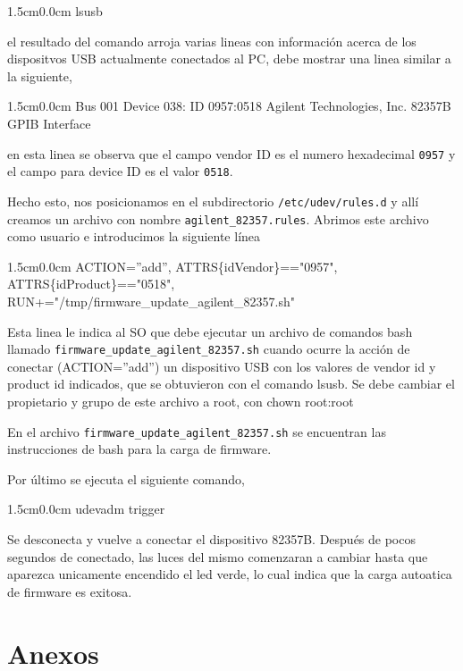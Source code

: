 \documentclass[paper=letter,oneside,fontsize=11pt, parskip=full]{scrartcl}
\newenvironment{code}
	{\begin{adjustwidth}{1.5cm}{0.0cm}\ttfamily}
	{\end{adjustwidth}}
\begin{document}
	\begin{code}
		lsusb
	\end{code}

	el resultado del comando arroja varias lineas con información acerca de los dispositvos USB actualmente conectados al PC, debe mostrar una linea similar a la siguiente,	

	\begin{code}
		Bus 001 Device 038: ID 0957:0518 Agilent Technologies, Inc. 82357B GPIB Interface
	\end{code}

	en esta linea se observa que el campo vendor ID es el numero hexadecimal \texttt{0957} y el campo para device ID es el valor \texttt{0518}.
	
	Hecho esto, nos posicionamos en el subdirectorio \texttt{/etc/udev/rules.d} y allí creamos un archivo con nombre \texttt{agilent\_82357.rules}. Abrimos este archivo como usuario e introducimos la siguiente línea
	
	\begin{code}
		ACTION=''add'', ATTRS\{idVendor\}=="0957", ATTRS\{idProduct\}=="0518", \\ RUN+="/tmp/firmware\_update\_agilent\_82357.sh"		
	\end{code}

	Esta linea le indica al SO que debe ejecutar un archivo de comandos bash llamado  \texttt{firmware\_update\_agilent\_82357.sh} cuando ocurre la acción de conectar (ACTION=''add'') un dispositivo USB con los valores de vendor id y product id indicados, que se obtuvieron con el comando lsusb. Se debe cambiar el propietario y grupo de este archivo a root, con chown root:root
	
	En el archivo \texttt{firmware\_update\_agilent\_82357.sh} se encuentran las instrucciones de bash para la carga de firmware.

	Por último se ejecuta el siguiente comando,
	
	\begin{code}
		udevadm trigger
	\end{code}

	Se desconecta y vuelve a conectar el dispositivo 82357B. Después de pocos segundos de conectado, las luces del mismo comenzaran a cambiar hasta que aparezca unicamente encendido el led verde, lo cual indica que la carga autoatica de firmware es exitosa.
			
	\section{Anexos}	
		
\end{document}
